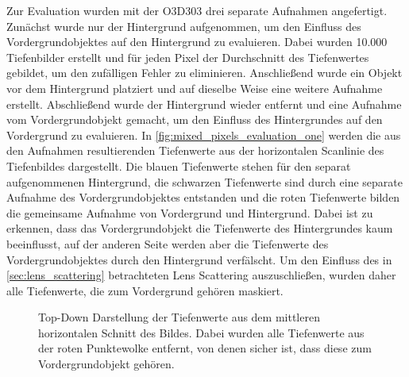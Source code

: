 \documentclass[thesis.tex]{subfiles}
\begin{document}
Zur Evaluation wurden mit der O3D303 drei separate Aufnahmen angefertigt. Zunächst wurde nur der Hintergrund aufgenommen, um den Einfluss des Vordergrundobjektes auf den Hintergrund zu evaluieren. Dabei wurden 10.000 Tiefenbilder erstellt und für jeden Pixel der Durchschnitt des Tiefenwertes gebildet, um den zufälligen Fehler zu eliminieren. Anschließend wurde ein Objekt vor dem Hintergrund platziert und auf dieselbe Weise eine weitere Aufnahme erstellt. Abschließend wurde der Hintergrund wieder entfernt und eine Aufnahme vom Vordergrundobjekt gemacht, um den Einfluss des Hintergrundes auf den Vordergrund zu evaluieren. In \autoref{fig:mixed_pixels_evaluation_one} werden die aus den Aufnahmen resultierenden Tiefenwerte aus der horizontalen Scanlinie des Tiefenbildes dargestellt. Die blauen Tiefenwerte stehen für den separat aufgenommenen Hintergrund, die schwarzen Tiefenwerte sind durch eine separate Aufnahme des Vordergrundobjektes entstanden und die roten Tiefenwerte bilden die gemeinsame Aufnahme von Vordergrund und Hintergrund. Dabei ist zu erkennen, dass das Vordergrundobjekt die Tiefenwerte des Hintergrundes kaum beeinflusst, auf der anderen Seite werden aber die Tiefenwerte des Vordergrundobjektes durch den Hintergrund verfälscht. Um den Einfluss des in \autoref{sec:lens_scattering} betrachteten Lens Scattering auszuschließen, wurden daher alle Tiefenwerte, die zum Vordergrund gehören maskiert.

\begin{figure}[h!]
\centering
{}
\caption{Top-Down Darstellung der Tiefenwerte aus dem mittleren horizontalen Schnitt des Bildes. Dabei wurden alle Tiefenwerte aus der roten Punktewolke entfernt, von denen sicher ist, dass diese zum Vordergrundobjekt gehören.}
\label{fig:mixed_pixels_evaluation_two}
\end{figure}
\end{document}
